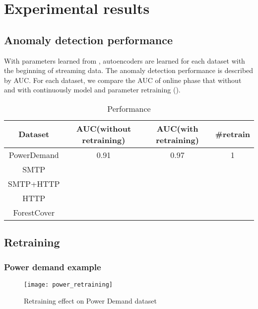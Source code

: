 \chapter{Experimental results}
\label{chap:results}


\section{Anomaly detection performance}
\label{sec:performance}

With parameters learned from , autoencoders are learned for each dataset with the beginning of streaming data. The anomaly detection performance is described by AUC. For each dataset, we compare the AUC of online phase that without and with continuously model and parameter retraining (). 

\begin{table}[h] 
\caption{Performance} 
\centering      
\begin{tabular}{c | c | c | c}  
\hline  
Dataset & AUC(without retraining) & AUC(with retraining) & \#retrain \\ 
\hline 
PowerDemand & 0.91 & 0.97 & 1  \\  
\hline 
SMTP &  &  &  \\ 
\hline 
SMTP+HTTP &  &  & \\ 
\hline 
HTTP &  &   &   \\ 
\hline 
ForestCover & &  & \\   
\hline    
\end{tabular}
\label{tab:performance}  
\end{table} 




\section{Retraining}
\label{sec:retraining}

\subsection{Power demand example}
\label{sec:example}

\begin{figure}[h]
\centering
\texttt{[image: power\_retraining]}
\caption[Retraining effect on Power Demand dataset]{Retraining effect on Power Demand dataset}
\label{fig:power_retraining}
\end{figure}



